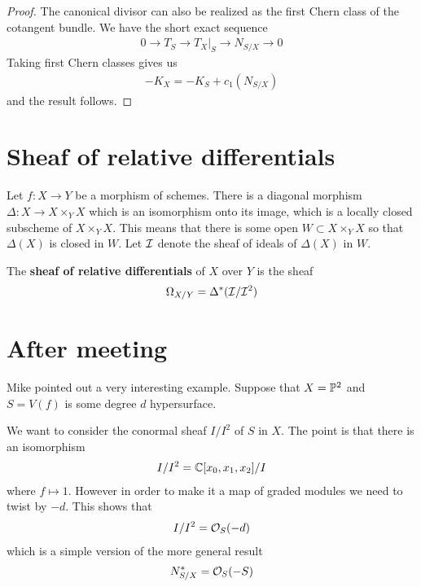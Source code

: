 \documentclass[12pt]{article}
\begin{document}
\begin{proof}
    The canonical divisor can also be realized as the first Chern class of the cotangent bundle. We have the short exact sequence
    \begin{align*}
        0 \to T_S \to T_X\vert_S \to N_{S/X}\to 0
    \end{align*}
    Taking first Chern classes gives us \begin{align*}
        -K_X = -K_S + c_1(N_{S/X})
    \end{align*}
    and the result follows.
\end{proof}

\section{Sheaf of relative differentials}
Let $f:X\to Y$ be a morphism of schemes. There is a diagonal morphism $\Delta:X\to X\times_Y X$ which is an
isomorphism onto its image, which is a locally closed subscheme of $X\times_Y X$. This means that there is 
some open $W\subset X\times_Y X$ so that $\Delta(X)$ is closed in $W$. Let $\cI$ denote the
sheaf of ideals of $\Delta(X)$ in $W$.

\begin{definition}
    The \textbf{sheaf of relative differentials} of $X$ over $Y$ is the sheaf \begin{align*}
        \Omega_{X/Y} = \Delta^*(\cI/\cI^2)
    \end{align*}
\end{definition}

\section{After meeting}
Mike pointed out a very interesting example.
Suppose that $X = \P^2$ and $S = V(f)$ is some degree $d$ hypersurface.

We want to consider the conormal sheaf $I/I^2$ of $S$ in $X$. The point is that there is an isomorphism \begin{align*}
    I/I^2 = \C[x_0,x_1,x_2]/I
\end{align*} where $f \mapsto 1$. However in order to make it a map of graded modules we need to
twist by $-d$. This shows that \begin{align*}
    I/I^2 = \cO_S(-d)
\end{align*} which is a simple version of the more general result \begin{align*}
    N_{S/X}^* = \cO_S(-S)
\end{align*}
\end{document}
